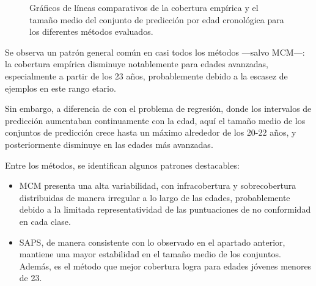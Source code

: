 \begin{figure}[htbp]
    \caption[
        Gráficos de líneas comparativos de la cobertura empírica y el tamaño medio del conjunto de predicción por edad cronológica para los diferentes métodos evaluados.
    ]{
        Gráficos de líneas comparativos de la cobertura empírica y el tamaño medio del conjunto de predicción por edad cronológica para los diferentes métodos evaluados.
    }
    \label{fig:AGC_EC_MPSS_by_true_age}
\end{figure}

Se observa un patrón general común en casi todos los métodos ---salvo MCM---: la cobertura empírica disminuye notablemente para edades avanzadas, especialmente a partir de los 23 años, probablemente debido a la escasez de ejemplos en este rango etario.

Sin embargo, a diferencia de con el problema de regresión, donde los intervalos de predicción aumentaban continuamente con la edad, aquí el tamaño medio de los conjuntos de predicción crece hasta un máximo alrededor de los 20-22 años, y posteriormente disminuye en las edades más avanzadas.

Entre los métodos, se identifican algunos patrones destacables:

\begin{itemize}

    \item MCM presenta una alta variabilidad, con infracobertura y sobrecobertura distribuidas de manera irregular a lo largo de las edades, probablemente debido a la limitada representatividad de las puntuaciones de no conformidad en cada clase.
    
    
    \item SAPS, de manera consistente con lo observado en el apartado anterior, mantiene una mayor estabilidad en el tamaño medio de los conjuntos. Además, es el método que mejor cobertura logra para edades jóvenes menores de 23.
    
\end{itemize}





